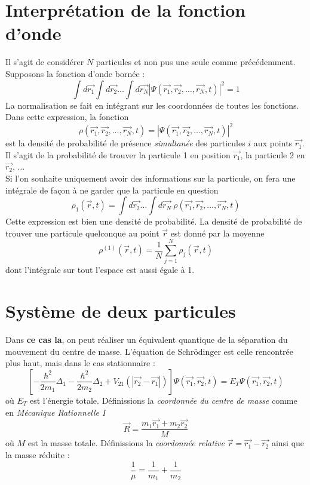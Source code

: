 \documentclass	[11pt, a4paper, openany]{book}
\begin{document}
\section{Interprétation de la fonction d'onde}
Il s'agit de considérer $N$ particules et non pus une seule comme précédemment. Supposons la fonction d'onde bornée :
\begin{equation}
\int d\vec{r_1}\int d\vec{r_2}\dots\int d\vec{r_N}|\Psi(\vec{r_1}, \vec{r_2}, \dots, \vec{r_N}, t)|^2 = 1
\end{equation}
La normalisation se fait en intégrant sur les coordonnées de toutes les fonctions. Dans cette expression, la fonction 
\begin{equation}
\rho(\vec{r_1}, \vec{r_2}, \dots, \vec{r_N}, t)=|\Psi(\vec{r_1}, \vec{r_2}, \dots, \vec{r_N}, t)|^2
\end{equation}
est la densité de probabilité de présence \textit{simultanée} des particules $i$ aux points $\vec{r_1}$. Il s'agit de la probabilité de trouver la particule 1 en position $\vec{r_1}$, la particule 2 en $\vec{r_2}$, ...\\
Si l'on souhaite uniquement avoir des informations sur la particule, on fera une intégrale de façon à ne garder que la particule en question
\begin{equation}
\rho_1(\vec{r},t) = \int d\vec{r_2}\dots\int d\vec{r_N}\ \rho(\vec{r_1}, \vec{r_2}, \dots, \vec{r_N}, t)
\end{equation}
Cette expression est bien une densité de probabilité. La densité de probabilité de trouver une particule quelconque au point $\vec{r}$ est donné par la moyenne
\begin{equation}
\rho^{(1)}(\vec{r},t) = \frac{1}{N}\sum_{j=1}^N \rho_j(\vec{r},t)
\end{equation}
dont l'intégrale sur tout l'espace est aussi égale à 1.

\section{Système de deux particules}
Dans \textbf{ce cas la}, on peut réaliser un équivalent quantique de la séparation du mouvement du centre de masse. L'équation de Schrödinger est celle rencontrée plus haut, mais dans le cas stationnaire :
\begin{equation}
\left[-\frac{\hbar^2}{2m_1}\Delta_1 - \frac{\hbar^2}{2m_2}\Delta_2 + V_{21}(|\vec{r_2}-\vec{r_1}|) \right]\Psi(\vec{r_1}, \vec{r_2},t) = E_T \Psi(\vec{r_1}, \vec{r_2},t)
\end{equation}
où $E_T$ est l'énergie totale. Définissions la \textit{coordonnée du centre de masse} comme en \textit{Mécanique Rationnelle I}
\begin{equation}
\vec{R} = \frac{m_1\vec{r_1}+m_2\vec{r_2}}{M}
\end{equation}
où $M$ est la masse totale. Définissions la \textit{coordonnée relative} $\vec{r} = \vec{r_1}-\vec{r_2}$ ainsi que la masse réduite :
\begin{equation}
\frac{1}{\mu} = \frac{1}{m_1}+\frac{1}{m_2}
\end{equation}
\end{document}
